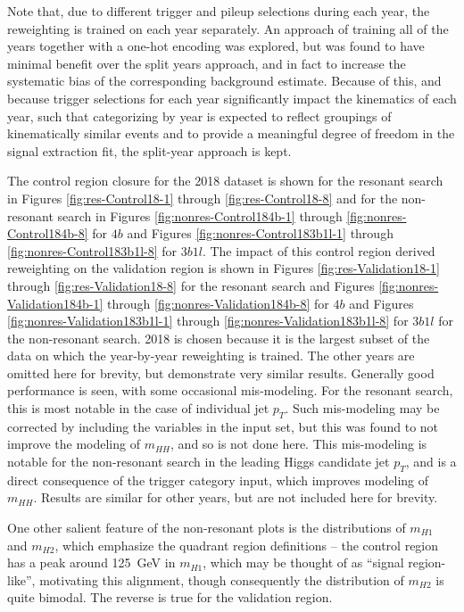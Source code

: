 Note that, due to different trigger and pileup selections during each year, 
the reweighting is trained on each year separately. An approach of training all of the years 
together with a one-hot encoding was explored, but was found to have minimal 
benefit over the split years approach, and in fact to increase 
the systematic bias of the corresponding background estimate.
Because of this, and because trigger selections for each year significantly impact the kinematics of each year, 
such that categorizing by year is expected to reflect groupings of kinematically similar events and 
to provide a meaningful degree of freedom in the signal extraction fit, the split-year approach is
kept.

The control region closure for the 2018 dataset is shown for the resonant search in Figures \ref{fig:res-Control18-1} 
through \ref{fig:res-Control18-8} and for the non-resonant search in Figures \ref{fig:nonres-Control184b-1} 
through \ref{fig:nonres-Control184b-8} for $4b$ and Figures \ref{fig:nonres-Control183b1l-1} 
through \ref{fig:nonres-Control183b1l-8} for $3b1l$. The impact of this control 
region derived reweighting on the validation region is shown in Figures \ref{fig:res-Validation18-1} 
through \ref{fig:res-Validation18-8} for the resonant search and Figures \ref{fig:nonres-Validation184b-1} 
through \ref{fig:nonres-Validation184b-8} for $4b$ and Figures \ref{fig:nonres-Validation183b1l-1} 
through \ref{fig:nonres-Validation183b1l-8} for $3b1l$ for the non-resonant 
search. 2018 is chosen because it is the largest subset of the data on which the year-by-year reweighting 
is trained. The other years are omitted here for brevity, but demonstrate very similar results. Generally 
good performance is seen, with some occasional mis-modeling. For the resonant 
search, this is most notable in the case of individual jet $p_{T}$. Such mis-modeling may be corrected 
by including the variables in the input set, but this was found to not improve the modeling of $m_{HH}$, 
and so is not done here. This mis-modeling is notable for the non-resonant search in the leading Higgs candidate 
jet $p_{T}$, and is a direct consequence of the trigger category input, which improves modeling of $m_{HH}$.
Results are similar for other years, but are not included here for brevity. 

One other salient feature of the non-resonant plots is the distributions of $m_{H1}$ and $m_{H2}$, which 
emphasize the quadrant region definitions -- the control region has a peak around \SI{125}{\GeV} in $m_{H1}$, 
which may be thought of as ``signal region-like'', motivating this alignment, though consequently the 
distribution of $m_{H2}$ is quite bimodal. The reverse is true for the validation region.

